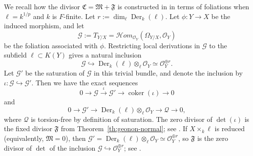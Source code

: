 \documentclass[10pt,abstract=true]{scrartcl}
\numberwithin{equation}{section}
\theoremstyle{definition}
\theoremstyle{remark}
\begin{document}
We recall how the divisor $\mathfrak C = \mathfrak M + \mathfrak F$ is constructed in \cite[\S3.2]{ji_structure_2021} in terms of foliations when $\ell = k^{1/p}$ and $k$ is $F$-finite.
Let $r := \dim_\ell\operatorname{Der}_k(\ell)$.
Let $\phi\colon Y\to X$ be the induced morphism, and let
\[
  \mathscr G := T_{Y/X} = \mathcal{H}om_{\mathcal O_Y}(\Omega_{Y/X},\mathcal O_Y)
\]
be the foliation associated with $\phi$.
Restricting local derivations in $\mathscr G$ to the subfield $\ell\subset K(Y)$ gives a natural inclusion
\[
  \mathscr G \hookrightarrow \operatorname{Der}_k(\ell)\otimes_\ell\mathcal O_Y \simeq \mathcal O_Y^{\oplus r}.
\]
Let $\mathscr G'$ be the saturation of $\mathscr G$ in this trivial bundle, and denote the inclusion by $\iota\colon\mathscr G\hookrightarrow\mathscr G'$.
Then we have the exact sequences
\begin{equation}\label{eq:foliation-inclusion-quotient}
  0\longrightarrow\mathscr G
  \xrightarrow{\iota}\mathscr G'
  \longrightarrow\operatorname{coker}(\iota)\longrightarrow0
\end{equation}
and
\begin{equation}\label{eq:foliation-saturation-quotient}
  0\longrightarrow\mathscr G'
  \longrightarrow\operatorname{Der}_k(\ell)\otimes_\ell\mathcal O_Y
  \longrightarrow\mathscr Q\longrightarrow0,
\end{equation}
where $\mathscr Q$ is torsion-free by definition of saturation.
The zero divisor of $\det(\iota)$ is the fixed divisor $\mathfrak F$ from Theorem~\ref{th:geonon-normal}; see \cite[Definition~3.2]{ji_structure_2021}.
If $X\times_k\ell$ is reduced (equivalently, $\mathfrak M=0$), then $\mathscr G'=\operatorname{Der}_k(\ell)\otimes_\ell\mathcal O_Y\simeq\mathcal O_Y^{\oplus r}$, so $\mathfrak F$ is the zero divisor of $\det$ of the inclusion $\mathscr G\hookrightarrow\mathcal O_Y^{\oplus r}$; see \cite[Remark~3.3]{ji_structure_2021}.
\end{document}
